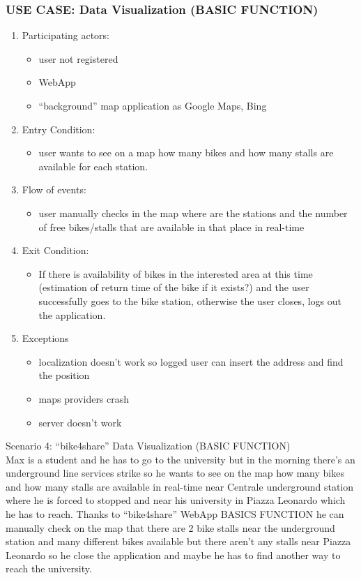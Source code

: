 \documentclass{article}
\begin{document}
\subsubsection{\textbf{USE CASE}: Data Visualization (BASIC FUNCTION)}
\begin{enumerate}
\item Participating actors: 
\begin{itemize}
    \item user not registered
    \item WebApp
    \item “background” map application as Google Maps, Bing
\end{itemize}
\item Entry Condition: 
\begin{itemize}
    \item user wants to see on a map how many bikes and how many stalls are available for each station.
\end{itemize}
\item Flow of events: 
\begin{itemize}
    \item user manually checks in the map where are the stations and the number of free bikes/stalls that are available in that place in real-time
\end{itemize}
\item Exit Condition: 
\begin{itemize}
    \item If there is availability of bikes in the interested area at this time (estimation of return time of the bike if it exists?) and the user successfully goes to the bike station, otherwise the user closes, logs out  the application.
\end{itemize}
\item Exceptions
\begin{itemize}
    \item localization doesn’t work so logged user can insert the address and find the position
    \item maps providers crash
    \item server doesn’t work
\end{itemize}
\end{enumerate}

 Scenario 4: “bike4share” Data Visualization (BASIC FUNCTION) \\
Max is a student and he has to go to the university but in the morning there’s an underground line services strike so he wants to see on the map how many bikes and how many stalls are available in real-time near Centrale underground station where he is forced to stopped and near his university in Piazza Leonardo which he has to reach. 
Thanks to “bike4share” WebApp BASICS FUNCTION he can manually check on the map that there are 2 bike stalls near the underground station and many different bikes available but there aren’t any stalls near Piazza Leonardo so he close the application and maybe he has to find another way to reach the university.
\end{document}
